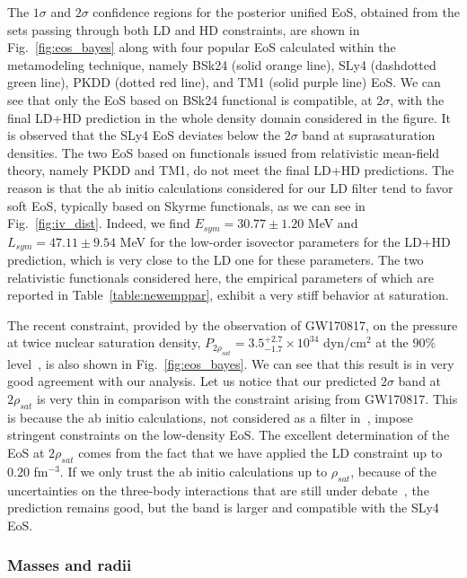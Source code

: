 The $1\sigma$ and $2\sigma$ confidence regions for the posterior unified EoS,
obtained from the sets passing through both LD and HD constraints, are shown in
Fig.~\ref{fig:eos_bayes} along with four popular EoS calculated within the
metamodeling technique, namely BSk24 (solid orange line), SLy4 (dashdotted
green line), PKDD (dotted red line), and TM1 (solid purple line) EoS. 
We can see that only the EoS based on BSk24 functional is
compatible, at $2\sigma$, with the final LD+HD prediction in the whole density 
domain considered in the figure. It is observed that the SLy4 EoS deviates
below the $2\sigma$ band at suprasaturation densities.
The two EoS based on functionals issued from relativistic mean-field theory, 
namely PKDD and TM1, do not meet the final LD+HD predictions. The reason is 
that the ab initio calculations considered for our LD filter 
\cite{Drischler2016} tend to favor soft EoS, typically based on Skyrme
functionals, as we can see in Fig.~\ref{fig:iv_dist}. Indeed, we find $E_{sym}
= 30.77 \pm 1.20$ MeV and $L_{sym} = 47.11 \pm 9.54$ MeV for the low-order
isovector parameters for the LD+HD prediction, which is very close to the LD
one for these parameters. The two relativistic functionals considered
here, the empirical parameters of which are reported in
Table~\ref{table:newemppar}, exhibit a very stiff behavior at saturation.
 
The recent constraint, provided by the observation of GW170817, on 
the pressure at twice nuclear saturation density, $P_{2\rho_{sat}} =
3.5_{-1.7}^{+2.7}\times 10^{34}$ dyn/cm$^2$ at the $90\%$ level~\cite{GW1}, is 
also shown in Fig.~\ref{fig:eos_bayes}. We can see that this result is in very 
good agreement with our analysis. Let us notice that our predicted $2\sigma$ 
band at $2\rho_{sat}$ is very thin in comparison with the constraint 
arising from GW170817. This is because the ab initio calculations, not 
considered as a filter in~\cite{GW1}, impose stringent constraints on the 
low-density EoS.
%
{The excellent determination of the EoS at $2\rho_{sat}$ comes from the 
   fact that we have applied the LD constraint up to $0.20$ fm$^{-3}$. If we 
   only trust the ab initio calculations up to $\rho_{sat}$, because of the 
uncertainties on the three-body interactions that are still under
debate~\cite{Tews2019}, the prediction remains good, but the band is larger and 
compatible with the SLy4 EoS.}

\subsubsection{Masses and radii} %

